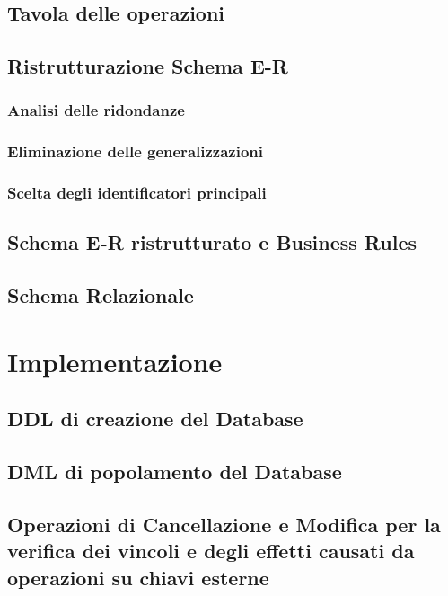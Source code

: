 \documentclass[12pt]{extarticle}
\begin{document}
\subsection{Tavola delle operazioni}

\subsection{Ristrutturazione Schema E-R}
\subsubsection{Analisi delle ridondanze}
\subsubsection{Eliminazione delle generalizzazioni}
\subsubsection{Scelta degli identificatori principali}

\subsection{Schema E-R ristrutturato e Business Rules}

\subsection{Schema Relazionale}

\section{Implementazione}
\subsection{DDL di creazione del Database}

\subsection{DML di popolamento del Database}

\subsection{Operazioni di Cancellazione e Modifica per la verifica dei vincoli e degli effetti causati da operazioni su chiavi esterne}
\end{document}
